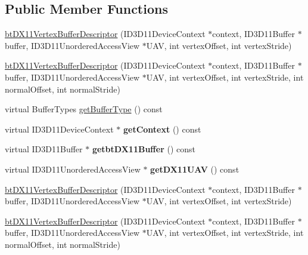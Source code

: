 \subsection*{Public Member Functions}
\begin{DoxyCompactItemize}
\item 
\hyperlink{classbtDX11VertexBufferDescriptor_af395186594c4954fb48971cd7e1eb2b8}{bt\+D\+X11\+Vertex\+Buffer\+Descriptor} (I\+D3\+D11\+Device\+Context $\ast$context, I\+D3\+D11\+Buffer $\ast$buffer, I\+D3\+D11\+Unordered\+Access\+View $\ast$U\+AV, int vertex\+Offset, int vertex\+Stride)
\item 
\hyperlink{classbtDX11VertexBufferDescriptor_a85ff10c8bcf97f7109496411d2eded6e}{bt\+D\+X11\+Vertex\+Buffer\+Descriptor} (I\+D3\+D11\+Device\+Context $\ast$context, I\+D3\+D11\+Buffer $\ast$buffer, I\+D3\+D11\+Unordered\+Access\+View $\ast$U\+AV, int vertex\+Offset, int vertex\+Stride, int normal\+Offset, int normal\+Stride)
\item 
virtual Buffer\+Types \hyperlink{classbtDX11VertexBufferDescriptor_aaa92499e7319fda25f7cd787b14c4933}{get\+Buffer\+Type} () const
\item 
\mbox{\label{classbtDX11VertexBufferDescriptor_a3c99b743df080a7c5e0a58aaaaffc3e6}} 
virtual I\+D3\+D11\+Device\+Context $\ast$ {\bfseries get\+Context} () const
\item 
\mbox{\label{classbtDX11VertexBufferDescriptor_ac059d92caa0dfb2cfae17f648e40e492}} 
virtual I\+D3\+D11\+Buffer $\ast$ {\bfseries getbt\+D\+X11\+Buffer} () const
\item 
\mbox{\label{classbtDX11VertexBufferDescriptor_a1cc8a36072951fc6b7c45e7329916308}} 
virtual I\+D3\+D11\+Unordered\+Access\+View $\ast$ {\bfseries get\+D\+X11\+U\+AV} () const
\item 
\hyperlink{classbtDX11VertexBufferDescriptor_af395186594c4954fb48971cd7e1eb2b8}{bt\+D\+X11\+Vertex\+Buffer\+Descriptor} (I\+D3\+D11\+Device\+Context $\ast$context, I\+D3\+D11\+Buffer $\ast$buffer, I\+D3\+D11\+Unordered\+Access\+View $\ast$U\+AV, int vertex\+Offset, int vertex\+Stride)
\item 
\hyperlink{classbtDX11VertexBufferDescriptor_a85ff10c8bcf97f7109496411d2eded6e}{bt\+D\+X11\+Vertex\+Buffer\+Descriptor} (I\+D3\+D11\+Device\+Context $\ast$context, I\+D3\+D11\+Buffer $\ast$buffer, I\+D3\+D11\+Unordered\+Access\+View $\ast$U\+AV, int vertex\+Offset, int vertex\+Stride, int normal\+Offset, int normal\+Stride)

\end{DoxyCompactItemize}
